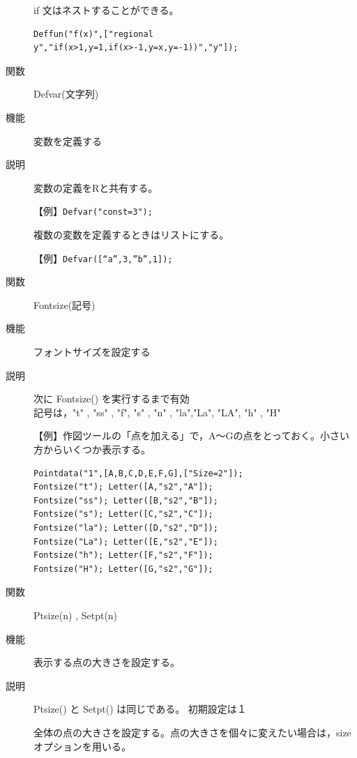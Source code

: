 \documentclass[papersize,a4paper,12pt,uplatex]{jsarticle}
\begin{document}
\begin{description}
if 文はネストすることができる。
\begin{verbatim}
Deffun("f(x)",["regional y","if(x>1,y=1,if(x>-1,y=x,y=-1))","y"]);
\end{verbatim}

\vspace{\baselineskip}
\hspace{20mm}\scalebox{0.9}{}


\vspace{\baselineskip}
\hypertarget{defvar}{}
\item[関数]Defvar(文字列)
\item[機能]変数を定義する
\item[説明]変数の定義をRと共有する。

【例】\verb|Defvar("const=3");|

\vspace{\baselineskip}
複数の変数を定義するときはリストにする。

【例】\verb|Defvar([“a”,3,”b”,1]);|

\vspace{\baselineskip}
\hypertarget{fontsize}{}
\item[関数]Fontsize(記号)
\item[機能]フォントサイズを設定する
\item[説明]次に Fontsize() を実行するまで有効\\
記号は，"t" , "ss" , "f", "s" , "n" , "la","La", "LA", "h" , "H"

【例】作図ツールの「点を加える」で，A〜Gの点をとっておく。小さい方からいくつか表示する。
\begin{verbatim}
Pointdata("1",[A,B,C,D,E,F,G],["Size=2"]);
Fontsize("t"); Letter([A,"s2","A"]);
Fontsize("ss"); Letter([B,"s2","B"]);
Fontsize("s"); Letter([C,"s2","C"]);
Fontsize("la"); Letter([D,"s2","D"]);
Fontsize("La"); Letter([E,"s2","E"]);
Fontsize("h"); Letter([F,"s2","F"]);
Fontsize("H"); Letter([G,"s2","G"]);
\end{verbatim}


\vspace{\baselineskip}
\hypertarget{setpt}{}
\hypertarget{ptsize}{}
\item[関数]Ptsize(n) , Setpt(n)
\item[機能]表示する点の大きさを設定する。
\item[説明]Ptsize() と Setpt() は同じである。 初期設定は１

全体の点の大きさを設定する。点の大きさを個々に変えたい場合は，sizeオプションを用いる。


\end{description}
\end{document}
